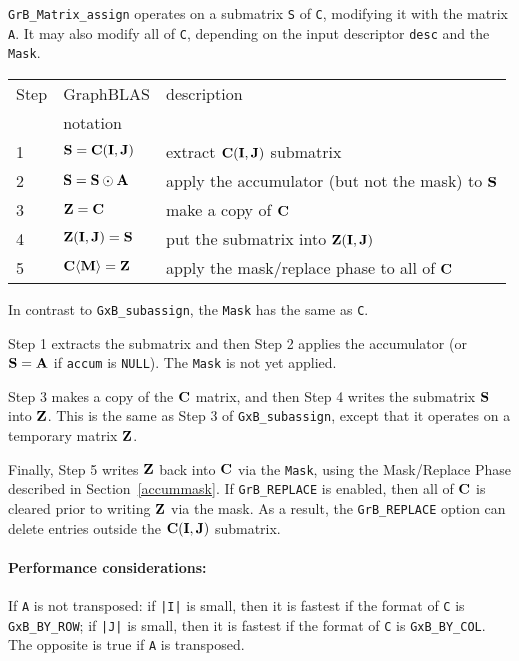 \documentclass[12pt]{article}
\begin{document}
\verb'GrB_Matrix_assign' operates on a submatrix \verb'S' of \verb'C',
modifying it with the matrix \verb'A'.  It may also modify all of \verb'C',
depending on the input descriptor \verb'desc' and the \verb'Mask'.

\vspace{0.1in}
\begin{tabular}{lll}
\hline
Step & GraphBLAS & description \\
     & notation  & \\
\hline
1 & ${\bf S} = {\bf C(I,J)}$                & extract ${\bf C(I,J)}$ submatrix \\
2 & ${\bf S} = {\bf S} \odot {\bf A}$       & apply the accumulator (but not the mask) to ${\bf S}$\\
3 & ${\bf Z} = {\bf C}$                     & make a copy of ${\bf C}$ \\
4 & ${\bf Z(I,J)} = {\bf S}$                & put the submatrix into ${\bf Z(I,J)}$ \\
5 & ${\bf C \langle M \rangle = Z}$         & apply the mask/replace phase to all of ${\bf C}$ \\
\hline
\end{tabular}
\vspace{0.1in}

In contrast to \verb'GxB_subassign', the \verb'Mask' has the same as \verb'C'.

Step 1 extracts the submatrix and then Step 2 applies the accumulator
(or ${\bf S}={\bf A}$ if \verb'accum' is \verb'NULL').  The \verb'Mask' is
not yet applied.

Step 3 makes a copy of the ${\bf C}$ matrix, and then Step 4 writes the
submatrix ${\bf S}$ into ${\bf Z}$.  This is the same as Step 3 of
\verb'GxB_subassign', except that it operates on a temporary matrix ${\bf Z}$.

Finally, Step 5 writes ${\bf Z}$ back into ${\bf C}$ via the \verb'Mask', using
the Mask/Replace Phase described in Section~\ref{accummask}.  If
\verb'GrB_REPLACE' is enabled, then all of ${\bf C}$ is cleared prior to
writing ${\bf Z}$ via the mask.  As a result, the \verb'GrB_REPLACE' option can
delete entries outside the ${\bf C(I,J)}$ submatrix.

\paragraph{\bf Performance considerations:} %
If \verb'A' is not transposed: if \verb'|I|' is small, then it is fastest if
the format of \verb'C' is \verb'GxB_BY_ROW'; if \verb'|J|' is small, then it is
fastest if the format of \verb'C' is \verb'GxB_BY_COL'.  The opposite is true
if \verb'A' is transposed.
\end{document}
